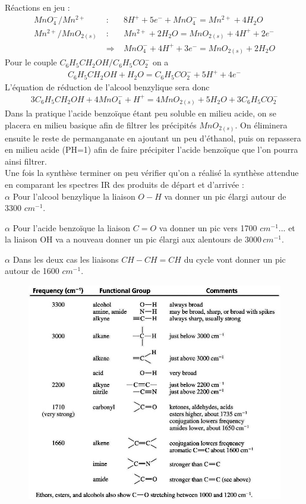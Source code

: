 \documentclass[12pt,prb,aps,epsf]{report}
\begin{document}
Réactions en jeu :\begin{eqnarray}
MnO_4^-/Mn^{2+}\; &:&\; 8H^+ + 5e^- + MnO_4^- = Mn^{2+} + 4H_2O\\
Mn^{2+}/MnO_{2(s)} \; &:& \; Mn^{2+} + 2H_2O = MnO_{2(s)} +4H^+ + 2e^-\\
&\Rightarrow& \; MnO_4^- +4H^+ + 3e^- = MnO_{2(s)} + 2H_2O
\end{eqnarray}
Pour le couple $C_6H_5CH_2OH/C_6H_5CO_2^-$ on a 
\begin{eqnarray}
C_6H_5CH_2OH + H_2O = C_6H_5CO_2^- + 5H^+ + 4e^-
\end{eqnarray} 
L'équation de réduction de l'alcool benzylique sera donc 
\begin{eqnarray}
3C_6H_5CH_2OH + 4MnO_4^- + H^+ = 4MnO_{2(s)} + 5H_2O + 3C_6H_5CO_2^-
\end{eqnarray}
Dans la pratique l'acide benzoïque étant peu soluble en milieu acide, on se placera en milieu basique afin de filtrer les précipités $MnO_{2(s)}$. On éliminera ensuite le reste de permanganate en ajoutant un peu d'éthanol, puis on repassera en milieu acide (PH=1) afin de faire précipiter l'acide benzoïque que l'on pourra ainsi filtrer.\\
Une fois la synthèse terminer on peu vérifier qu'on a réalisé la synthèse attendue en comparant les spectres IR des produits de départ et d'arrivée :\\

$\alpha$ Pour l'alcool benzylique la liaison $O-H$ va donner un pic élargi autour de 3300 $cm^{-1}$.

$\alpha$ Pour l'acide benzoïque la liaison $C=O$ va donner un pic vers 1700 $cm^{-1}$... et la liaison OH va a nouveau donner un pic élargi aux alentours de $3000\,cm^{-1}$.

$\alpha$ Dans les deux cas les liaisons $CH-CH=CH$ du cycle vont donner un pic autour de 1600 $cm^{-1}$.
\begin{figure}[h!]
	\centerline{\includegraphics[width=12cm]{IR-Table}}
\end{figure}
\end{document}

